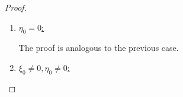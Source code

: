 \documentclass[10pt,a4paper]{amsart}
\begin{document}
\begin{proof}
\begin{enumerate}
\begin{align*}
&= c\int_{\mathbb{R}^m} |\mathcal{F}u (\xi)|^2 \mathrm{d}\xi \int_{\eta\in V} \langle \eta \rangle^{2r_2} |\mathcal{F}v (\eta)|^2 \mathrm{d}\eta
<\infty.
\end{align*}
Now, let $r'<0$. When $r_2 \geq 0 $, and $|\xi|\leq |\eta|$, it follows
\begin{align}
\label{triv}
\langle ( \xi , \eta ) \rangle^r
\leq \langle ( \xi , \eta ) \rangle^{r_2} \langle ( \xi , \eta ) \rangle^{r'}
\leq c \langle \eta \rangle^{r_2} \langle \xi \rangle^{r'}.
\end{align}
For $r_2 < 0$, \eqref{triv} trivially holds. Therefore,
\begin{align*}
\lVert \langle \cdot \rangle^{r} \mathcal{F} (u\otimes v) \rVert_{L^2 (W)} ^2
&\leq c^2 \iint_{\substack{ \eta\in V \\ |\xi|<|\eta| }} \langle \eta \rangle^{2r_2} \langle \xi \rangle^{2r'} |\mathcal{F}u (\xi)|^2 |\mathcal{F}v (\eta)|^2 \mathrm{d}\xi \mathrm{d}\eta\\
&\leq c^2\int_{\xi\in\mathbb{R}^m} \langle \xi \rangle^{2r'} |\mathcal{F}u (\xi)|^2 \mathrm{d}\xi \int_{\eta\in V } \langle \eta \rangle^{2r_2} |\mathcal{F}v (\eta)|^2 \mathrm{d}\eta
< \infty,
\end{align*}
since $u\in H_{loc}  ^{r'} (O)$ and has a compact support.

\item \underline{$\eta_0 = 0$:}

The proof is analogous to the previous case.

\item \underline{$\xi_0\neq0 , \eta_0\neq 0 $:}


\end{enumerate}
\end{proof}
\end{document}
